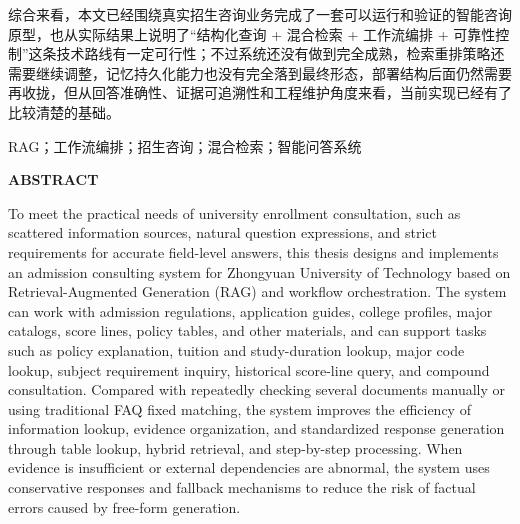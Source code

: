 \documentclass[UTF8,zihao=-4,oneside]{ctexbook}
\numberwithin{equation}{chapter}
\begin{document}
综合来看，本文已经围绕真实招生咨询业务完成了一套可以运行和验证的智能咨询原型，也从实际结果上说明了“结构化查询 + 混合检索 + 工作流编排 + 可靠性控制”这条技术路线有一定可行性；不过系统还没有做到完全成熟，检索重排策略还需要继续调整，记忆持久化能力也没有完全落到最终形态，部署结构后面仍然需要再收拢，但从回答准确性、证据可追溯性和工程维护角度来看，当前实现已经有了比较清楚的基础。

\vspace{0.8em}
RAG；工作流编排；招生咨询；混合检索；智能问答系统

\clearpage
\begin{center}
  {\bfseries\fontsize{15pt}{21pt}\selectfont ABSTRACT\par}
\end{center}
\vspace{1em}
\fontsize{12pt}{21pt}\selectfont
To meet the practical needs of university enrollment consultation, such as scattered information sources, natural question expressions, and strict requirements for accurate field-level answers, this thesis designs and implements an admission consulting system for Zhongyuan University of Technology based on Retrieval-Augmented Generation (RAG) and workflow orchestration. The system can work with admission regulations, application guides, college profiles, major catalogs, score lines, policy tables, and other materials, and can support tasks such as policy explanation, tuition and study-duration lookup, major code lookup, subject requirement inquiry, historical score-line query, and compound consultation. Compared with repeatedly checking several documents manually or using traditional FAQ fixed matching, the system improves the efficiency of information lookup, evidence organization, and standardized response generation through table lookup, hybrid retrieval, and step-by-step processing. When evidence is insufficient or external dependencies are abnormal, the system uses conservative responses and fallback mechanisms to reduce the risk of factual errors caused by free-form generation.
\end{document}
